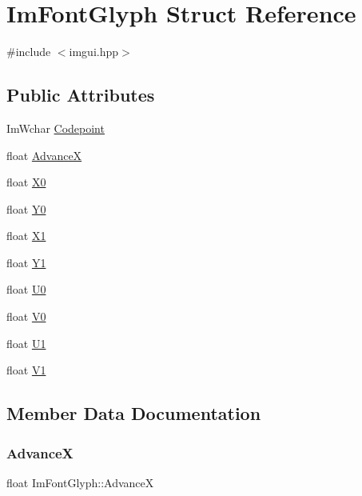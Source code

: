 \hypertarget{struct_im_font_glyph}{}\section{Im\+Font\+Glyph Struct Reference}
\label{struct_im_font_glyph}


{\ttfamily \#include $<$imgui.\+hpp$>$}

\subsection*{Public Attributes}
\begin{DoxyCompactItemize}
\item 
Im\+Wchar \hyperlink{struct_im_font_glyph_a3ff56d019068137a3df514caa3961421}{Codepoint}
\item 
float \hyperlink{struct_im_font_glyph_a11bfab7bcdb497fe2d649745c7d39b33}{AdvanceX}
\item 
float \hyperlink{struct_im_font_glyph_a1e93bf7292c052549972fc46646ff104}{X0}
\item 
float \hyperlink{struct_im_font_glyph_ac1deecd5b352949f30d396a58b68dd09}{Y0}
\item 
float \hyperlink{struct_im_font_glyph_a1d907170d807c5e5f2a43d74b99f0d89}{X1}
\item 
float \hyperlink{struct_im_font_glyph_aa6a0440694ae06c4cf03316498327bd2}{Y1}
\item 
float \hyperlink{struct_im_font_glyph_a3c9d90fb39f6beaf9d69413fa4c8366f}{U0}
\item 
float \hyperlink{struct_im_font_glyph_a26b7b7b9ee43ab67e98af9ea1131ce20}{V0}
\item 
float \hyperlink{struct_im_font_glyph_aaca9625f2d6972016e05fed583db85b0}{U1}
\item 
float \hyperlink{struct_im_font_glyph_a3d28904aad639835cdff3e4416663d7c}{V1}
\end{DoxyCompactItemize}


\subsection{Member Data Documentation}
\hypertarget{struct_im_font_glyph_a11bfab7bcdb497fe2d649745c7d39b33}{}\label{struct_im_font_glyph_a11bfab7bcdb497fe2d649745c7d39b33} 
\subsubsection{\texorpdfstring{AdvanceX}{AdvanceX}}
{\footnotesize\ttfamily float Im\+Font\+Glyph\+::\+AdvanceX}

